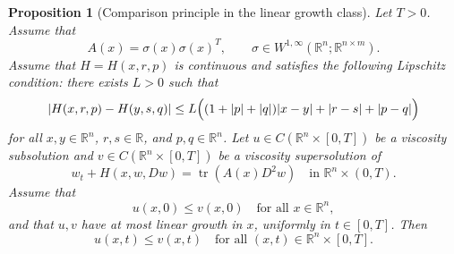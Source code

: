 \documentclass[10pt,a4paper]{amsart}
\newtheorem{proposition}{Proposition}
\begin{document}
\begin{proposition}[Comparison principle in the linear growth class]
Let \(T>0\). Assume that
\[
 A(x)=\sigma(x)\sigma(x)^T,
 \qquad
 \sigma\in W^{1,\infty}(\mathbb R^n;\mathbb R^{n\times m}).
\]
Assume that \(H=H(x,r,p)\) is continuous and satisfies the following Lipschitz condition: there exists \(L>0\) such that
\[
 |H(x,r,p)-H(y,s,q)|
 \le
 L\Bigl((1+|p|+|q|)|x-y|+|r-s|+|p-q|\Bigr)
\]
for all \(x,y\in\mathbb R^n\), \(r,s\in\mathbb R\), and \(p,q\in\mathbb R^n\). Let \(u\in C(\mathbb R^n\times[0,T])\) be a viscosity subsolution and \(v\in C(\mathbb R^n\times[0,T])\) be a viscosity supersolution of
\[
 w_t+H(x,w,Dw)=\operatorname{tr}(A(x)D^2w)
 \quad\text{in }\mathbb R^n\times(0,T).
\]
Assume that
\[
 u(x,0)\le v(x,0)
 \quad\text{for all }x\in\mathbb R^n,
\]
and that \(u,v\) have at most linear growth in \(x\), uniformly in \(t\in[0,T]\). Then
\[
 u(x,t)\le v(x,t)
 \quad\text{for all }(x,t)\in\mathbb R^n\times[0,T].
\]
\end{proposition}
\end{document}
